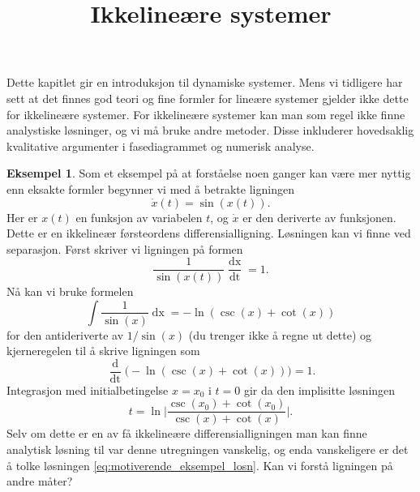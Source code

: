 \documentclass{article}
\title{Ikkelineære systemer}
\author{}
\date{}
\theoremstyle{plain}
\theoremstyle{definition}
\newtheorem{eksempel}[teorem]{Eksempel}
\theoremstyle{remark}
\newcommand{\diff}[1]{\mathop{d#1}}
\newcommand{\fcn}{x}
\newcommand{\biggabs}[1]{\bigg|#1\bigg|}
\newcommand{\bigparanth}[1]{\big(#1\big)}
\begin{document}
\maketitle

Dette kapitlet gir en introduksjon til dynamiske systemer. Mens vi tidligere har sett at det finnes god teori og fine formler for lineære systemer gjelder ikke dette for ikkelineære systemer. For ikkelineære systemer kan man som regel ikke finne analystiske løsninger, og vi må bruke andre metoder. Disse inkluderer hovedsaklig kvalitative argumenter i fasediagrammet og numerisk analyse.

\begin{eksempel}
    Som et eksempel på at forståelse noen ganger kan være mer nyttig enn eksakte formler begynner vi med å betrakte ligningen
    \begin{equation} \label{eks:motiverende_eksempel}
        \dot{\fcn}(t) = \sin(\fcn(t)).
    \end{equation}
    Her er $x(t)$ en funksjon av variabelen $t$, og $\dot{x}$ er den deriverte av funksjonen. Dette er en ikkelineær førsteordens differensialligning. Løsningen kan vi finne ved separasjon. Først skriver vi ligningen på formen
    \begin{equation*}
        \frac{1}{\sin(\fcn(t))} \frac{\diff{\fcn(t)}}{\diff{t}} = 1.
    \end{equation*}
    Nå kan vi bruke formelen
    \begin{equation*}
        \int \frac{1}{\sin(\fcn)} \diff{\fcn} = -\ln(\csc(\fcn) + \cot(\fcn))
    \end{equation*}
    for den antideriverte av $1/\sin(\fcn)$ (du trenger ikke å regne ut dette) og kjerneregelen til å skrive ligningen som
    \begin{equation*}
        \frac{\diff{}}{\diff{t}} \bigparanth{-\ln(\csc(\fcn) + \cot(\fcn))} = 1.
    \end{equation*}
    Integrasjon med initialbetingelse $\fcn = \fcn_0$ i $t = 0$ gir da den implisitte løsningen
    \begin{equation} \label{eq:motiverende_eksempel_losn}
        t = \ln \biggabs{ \frac{\csc(\fcn_0) + \cot(\fcn_0)}{\csc(\fcn) + \cot(\fcn)}}.
    \end{equation}
    Selv om dette er en av få ikkelineære differensialligningen man kan finne analytisk løsning til var denne utregningen vanskelig, og enda vanskeligere er det å tolke løsningen \eqref{eq:motiverende_eksempel_losn}. Kan vi forstå ligningen på andre måter?
    

\end{eksempel}
\end{document}

